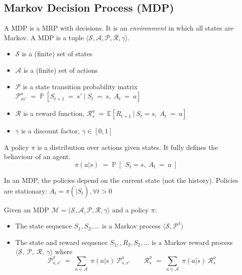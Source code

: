 \documentclass[10pt]{article}
\begin{document}
\subsection{Markov Decision Process (MDP)}
A MDP is a MRP with decisions. It is an \textit{environment} in which all states are Markov. \newline
A MDP is a tuple $\langle \mathcal{S, A, P, R,} \gamma \rangle$.

\begin{itemize}
\item $\mathcal{S}$ is a (finite) set of states
\item $\mathcal{A}$ is a (finite) set of actions
\item $\mathcal{P}$ is a state transition probability matrix \newline
$\mathcal{P}_{ss'}^{a} \; = \; \mathbb{P}\:[S_{t+1}\:=\:\textit{s'}\; | \; S_{t}\:=\:\textit{s}, \; A_{t}\:=\:\textit{a}]$
\item $\mathcal{R}$ is a reward function, $\mathcal{R}_{s}^{a}  \: = \: \mathbb{E}[R_{t+1} \: | \: S_{t} = s, \; A_{t}\:=\:\textit{a}]$
\item $\gamma$ is a discount factor, $\gamma \in [0,1]$
\end{itemize}

A policy $\pi$ is a distribution over actions given states. It fully defines the behaviour of an agent.
\begin{equation}
\pi(a|s) \; = \; \mathbb{P}\:[\:\: S_{t} = s, \; A_{t}\:=\:\textit{a}\:]
\end{equation}

In an MDP, the policies depend on the current state (not the history). Policies are stationary: $A_{t} = \pi ( \dot | S_{t} ), \forall t > 0$ \newline

Given an MDP $\mathcal{M} = \langle \mathcal{S, A, P, R,} \gamma \rangle$ and a policy $\pi$:
\begin{itemize}
\item The state sequence $S_{1}, S_{2}, \ldots$ is a Markov process $\langle \mathcal{S, P^{\pi}} \rangle$
\item The state and reward sequence $S_{1}, ,R_{2}, S_{2}, \ldots$ is a Markov reward process $\langle \mathcal{S}, \: \mathcal{P}, \: \mathcal{R}, \: \gamma \rangle$ where
\begin{equation}
\mathcal{P}_{s,s'}^{\pi} \; = \; \sum_{a \in \mathcal{A}} \; \pi (a|s)\: \mathcal{P}_{s,s'}^{a} \qquad
\mathcal{R}_{s}^{\pi} \; = \; \sum_{a \in \mathcal{A}} \; \pi (a|s)\: \mathcal{R}_{s}^{a} 
\end{equation}
\end{itemize}
\end{document}
